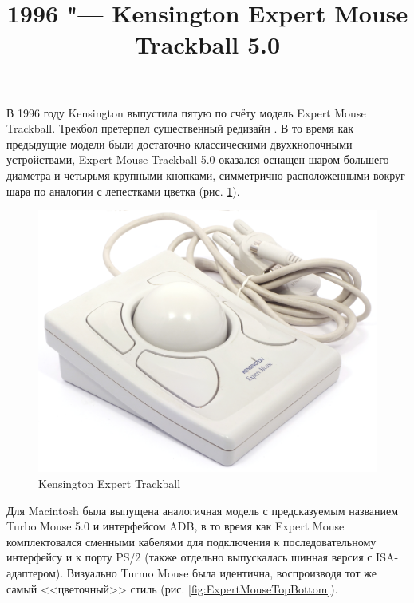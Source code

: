 \documentclass[11pt, a4paper]{article}
\begin{document}
\title{1996 "--- Kensington Expert Mouse Trackball 5.0}
\date{}
\maketitle
{}
В 1996 году Kensington выпустила пятую по счёту модель Expert Mouse Trackball. Трекбол претерпел существенный редизайн \cite{KensingtonPC}. В то время как предыдущие модели были достаточно классическими двухкнопочными устройствами, Expert Mouse Trackball 5.0 оказался оснащен шаром большего диаметра и четырьмя крупными кнопками, симметрично расположенными вокруг шара по аналогии с лепестками цветка (рис. \ref{fig:ExpertMousePic}).

\begin{figure}[h]
    \centering
    \includegraphics[scale=0.4]{1996_kensington_expert_trackball_5/pic_60.jpg}
    \caption{Kensington Expert Trackball}
    \label{fig:ExpertMousePic}
\end{figure}

Для Macintosh была выпущена аналогичная модель с предсказуемым названием Turbo Mouse 5.0 \cite{KensingtonMac} и интерфейсом ADB, в то время как Expert Mouse комплектовался сменными кабелями для подключения к последовательному интерфейсу и к порту PS/2 (также отдельно выпускалась шинная версия с ISA-адаптером). Визуально Turmo Mouse была идентична, воспроизводя тот же самый <<цветочный>> стиль (рис. \ref{fig:ExpertMouseTopBottom}).
\end{document}
